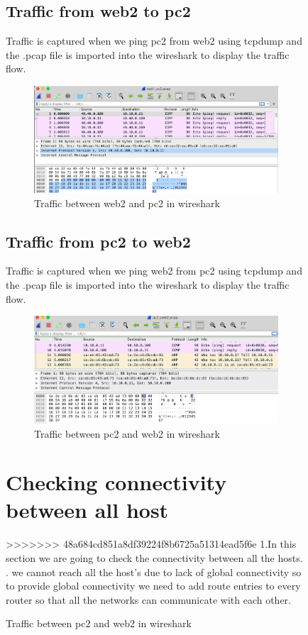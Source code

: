 \begin{figure}[H]
\subsection{Traffic from web2 to pc2}
Traffic is captured when we ping pc2 from web2 using tcpdump and the .pcap file is imported into the wireshark to display the traffic flow.
\begin{figure}[H]
\centering
  \includegraphics[width=400pt]{Images/web1_pc2_tcpdump.png}
  \caption{Traffic between web2 and pc2 in wireshark}
  \label{fig:2.4.3}
\end{figure}
\subsection{Traffic from pc2 to web2}
Traffic is captured when we ping web2 from pc2 using tcpdump and the .pcap file is imported into the wireshark to display the traffic flow.
\begin{figure}[H]
\centering
  \includegraphics[width=400pt]{Images/pc2_web2_tcpdump.png}
  \caption{Traffic between pc2 and web2 in wireshark}
  \label{fig:2.4.4}
\end{figure}

\section{Checking connectivity between all host}
>>>>>>> 48a684cd851a8df39224f8b6725a51314ead5f6e
1.In this section we are going to check the connectivity between all the hosts.
. we cannot reach all the host's due to lack of global connectivity so to provide global connectivity we need to add route entries to every router so that all the networks can communicate with each other.

\end{figure}
